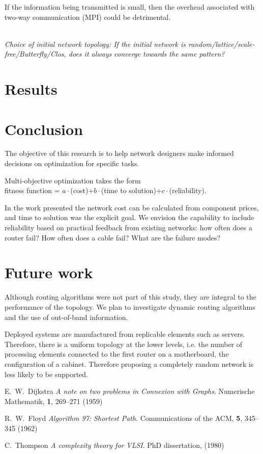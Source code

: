 \documentclass[pdftex]{article}
\begin{document}
If the information being transmitted is small, then the overhead associated with two-way communication (MPI) could be detrimental. 

\ \\
\textit{Choice of initial network topology: If the initial network is random/lattice/scale-free/Butterfly/Clos, does it always converge towards the same pattern?}


\section{Results}

\section{Conclusion}

The objective of this research is to help network designers make informed decisions on optimization for specific tasks. 

Multi-objective optimization takes the form\\
fitness function = $a\cdot$(cost)+$b\cdot$(time to solution)+$c\cdot$(reliability).

In the work presented the network cost can be calculated from component prices, and time to solution was the explicit goal. We envision the capability to include reliability based on practical feedback from existing networks: how often does a router fail? How often does a cable fail? What are the failure modes?

\section{Future work}

Although routing algorithms were not part of this study, they are integral to the performance of the topology. We plan to investigate dynamic routing algorithms and the use of out-of-band information. 

Deployed systems are manufactured from replicable elements such as servers. Therefore, there is a uniform topology at the lower levels, i.e. the number of processing elements connected to the first router on a motherboard, the configuration of a cabinet. Therefore proposing a completely random network is less likely to be supported.

\begin{thebibliography}{99}

E.~W.~Dijkstra \textit{A note on two problems in Connexion with Graphs}. Numerische Mathematik, \textbf{1}, 269--271 (1959)

R.~W.~Floyd \textit{Algorithm 97: Shortest Path}. Communications of the ACM, \textbf{5}, 345--345 (1962)

C.~Thompson \textit{A complexity theory for VLSI}. PhD dissertation, (1980)

\end{thebibliography}
\end{document}

